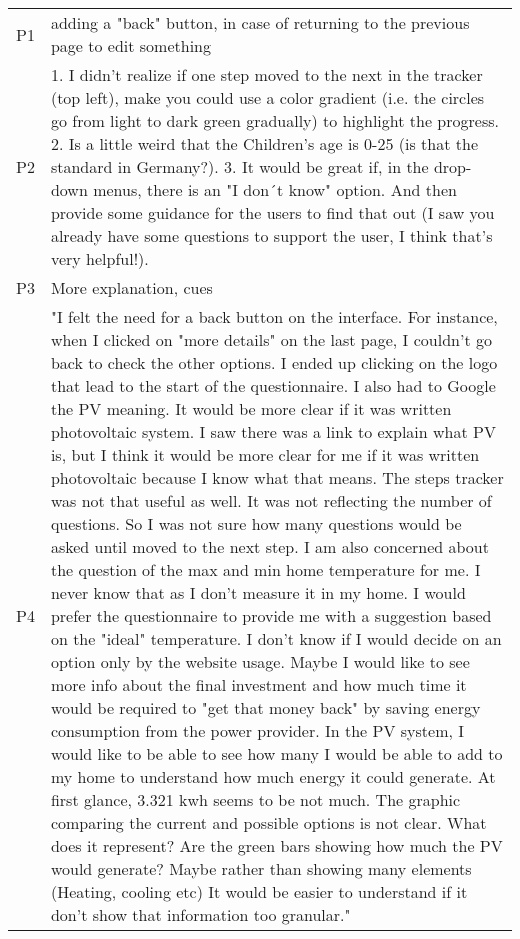 \begin{center}
  \scriptsize
  \begin{longtable}[h!]{ | p{} | p{} | }
    \hline  
    \rowcolor{lightgray} \multicolumn{2}{|c|}{Q6. What would you change about the website to make it more user-friendly?} \\
    \hline
    P1 & adding a "back" button, in case of returning to the previous page to edit something \\
    \hline
    P2 & 1. I didn't realize if one step moved to the next in the tracker (top left), make you could use a color gradient (i.e. the circles go from light to dark green gradually)  to highlight the progress. 2. Is a little weird that the Children's age is 0-25 (is that the standard in Germany?). 3. It would be great if, in the drop-down menus, there is an "I don´t know" option. And then provide some guidance for the users to find that out (I saw you already have some questions to support the user, I think that's very helpful!). \\
    \hline
    P3 & More explanation, cues \\
    \hline
    P4 & "I felt the need for a back button on the interface. For instance, when I clicked on "more details" on the last page, I couldn't go back to check the other options. I ended up clicking on the logo that lead to the start of the questionnaire.
    I also had to Google the PV meaning. It would be more clear if it was written photovoltaic system. I saw there was a link to explain what PV is, but I think it would be more clear for me if it was written photovoltaic because I know what that means. 
    The steps tracker was not that useful as well. It was not reflecting the number of questions. So I was not sure how many questions would be asked until moved to the next step.
    I am also concerned about the question of the max and min home temperature for me. I never know that as I don't measure it in my home. I would prefer the questionnaire to provide me with a suggestion based on the "ideal" temperature. 
    I don't know if I would decide on an option only by the website usage. Maybe I would like to see more info about the final investment and how much time it would be required to "get that money back" by saving energy consumption from the power provider.
    In the PV system, I would like to be able to see how many I would be able to add to my home to understand how much energy it could generate. At first glance, 3.321 kwh seems to be not much.
    The graphic comparing the current and possible options is not clear. What does it represent? Are the green bars showing how much the PV would generate? Maybe rather than showing many elements (Heating, cooling etc) It would be easier to understand if it don't show that information too granular." \\

\end{longtable}
\end{center}

